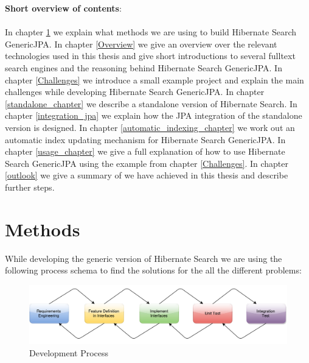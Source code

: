 \pagebreak

\noindent
\textbf{Short overview of contents}:
\\\\
\noindent
In chapter \ref{Methods} we explain what methods we are using to build Hibernate Search GenericJPA. In chapter \ref{Overview} we give an overview over the relevant technologies used in this thesis and give short introductions to several fulltext search engines and the reasoning behind Hibernate Search GenericJPA. In chapter \ref{Challenges} we introduce a small example project and explain the main challenges while developing Hibernate Search GenericJPA. In chapter \ref{standalone_chapter} we describe a standalone version of Hibernate Search. In chapter \ref{integration_jpa} we explain how the JPA integration of the standalone version is designed. In chapter \ref{automatic_indexing_chapter} we work out an automatic index updating mechanism for Hibernate Search GenericJPA. In chapter \ref{usage_chapter} we give a full explanation of how to use Hibernate Search GenericJPA using the example from chapter \ref{Challenges}. In chapter \ref{outlook} we give a summary of we have achieved in this thesis and describe further steps.

\pagebreak

\pagebreak

\section{Methods} \label{Methods}

While developing the generic version of Hibernate Search we are using the following process schema to find the solutions for the all the different problems:

\begin{figure}[ht]
	\centering
	\includegraphics[scale=0.52]{images/work_process.pdf}
	\caption{Development Process}
	\label{development_process_of_a_feature}
\end{figure}

